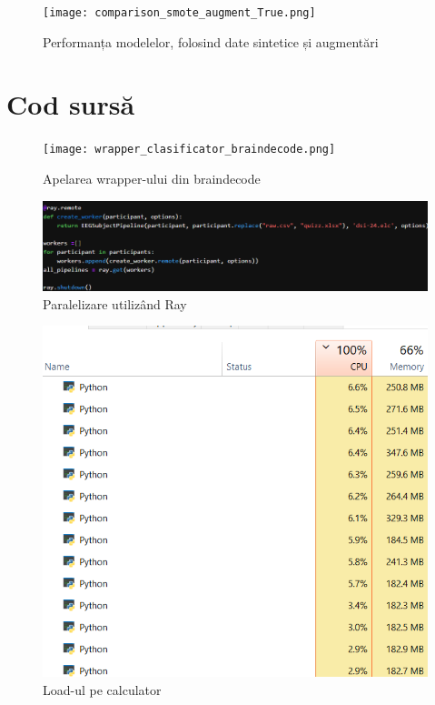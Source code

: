 \begin{figure}
    \centering
    \texttt{[image: comparison\_smote\_augment\_True.png]}
    \caption{Performanța modelelor, folosind date sintetice și augmentări}
    \label{fig:smote_augment_true}
\end{figure}

\chapter{Cod sursă}

\begin{figure}[h]
    \centering
    \texttt{[image: wrapper\_clasificator\_braindecode.png]}
    \caption{Apelarea wrapper-ului din braindecode}
    \label{fig:wrapper_braindecode}
\end{figure}

\begin{figure}[h]
    \centering
    \includegraphics[width=1\linewidth]{images/ray.png}
    \caption{Paralelizare utilizând Ray}
    \label{fig:paralelizare_ray}
\end{figure}

\begin{figure}[h]
    \centering
    \includegraphics[width=0.7\linewidth]{task_manager.png}
    \caption{Load-ul pe calculator}
    \label{fig:load_calculator}
\end{figure}

